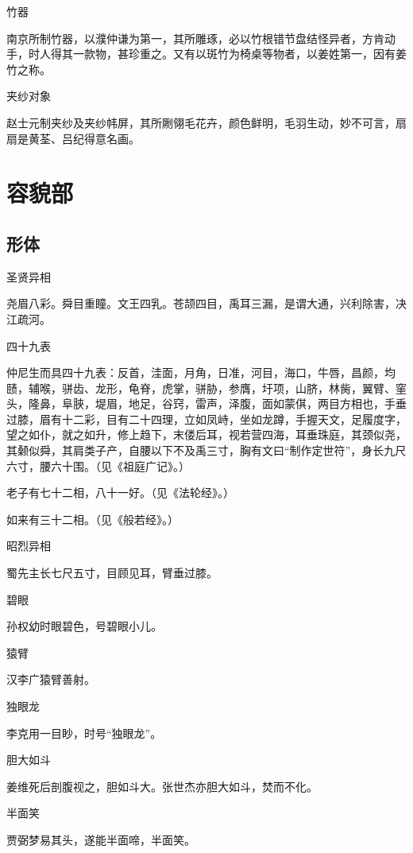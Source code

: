 \documentclass[a4paper,12pt,UTF8,twoside]{ctexbook}
\begin{document}
    竹器
    
    南京所制竹器，以濮仲谦为第一，其所雕琢，必以竹根错节盘结怪异者，方肯动手，时人得其一款物，甚珍重之。又有以斑竹为椅桌等物者，以姜姓第一，因有姜竹之称。
    
    夹纱对象
    
    赵士元制夹纱及夹纱帏屏，其所劂翎毛花卉，颜色鲜明，毛羽生动，妙不可言，扇扇是黄荃、吕纪得意名画。
    
    \part{容貌部}
    
    \chapter{形体}
    
    圣贤异相
    
    尧眉八彩。舜目重瞳。文王四乳。苍颉四目，禹耳三漏，是谓大通，兴利除害，决江疏河。
    
    四十九表
    
    仲尼生而具四十九表：反首，洼面，月角，日准，河目，海口，牛唇，昌颜，均赜，辅喉，骈齿、龙形，龟脊，虎掌，骈胁，参膺，圩项，山脐，林胔，翼臂、窐头，隆鼻，阜脥，堤眉，地足，谷窍，雷声，泽腹，面如蒙倛，两目方相也，手垂过膝，眉有十二彩，目有二十四理，立如凤峙，坐如龙蹲，手握天文，足履度字，望之如仆，就之如升，修上趋下，末偻后耳，视若营四海，耳垂珠庭，其颈似尧，其颡似舜，其肩类子产，自腰以下不及禹三寸，胸有文曰“制作定世符”，身长九尺六寸，腰六十围。（见《祖庭广记》。）
    
    老子有七十二相，八十一好。（见《法轮经》。）
    
    如来有三十二相。（见《般若经》。）
    
    昭烈异相
    
    蜀先主长七尺五寸，目顾见耳，臂垂过膝。
    
    碧眼
    
    孙权幼时眼碧色，号碧眼小儿。
    
    猿臂
    
    汉李广猿臂善射。
    
    独眼龙
    
    李克用一目眇，时号“独眼龙”。
    
    胆大如斗
    
    姜维死后剖腹视之，胆如斗大。张世杰亦胆大如斗，焚而不化。
    
    半面笑
    
    贾弼梦易其头，遂能半面啼，半面笑。
    
\end{document}
